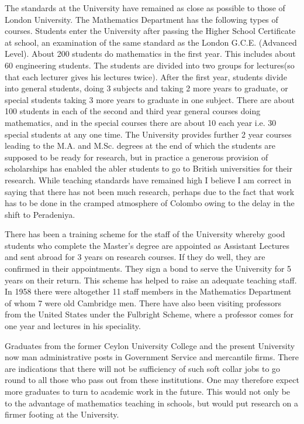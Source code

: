 The standards at the University have remained as close as possible to those of London University. The Mathematics Department has the following types of courses. Students enter the University after passing the Higher School Certificate at school, an examination of the same standard as the London G.C.E. (Advanced Level). About 200 students do mathematics in the first year. This includes about 60 engineering students. The students are divided into two groups for lectures\pageoriginale (so that each lecturer gives his lectures twice). After the first year, students divide into general students, doing 3 subjects and taking 2 more years to graduate, or special students taking 3 more years to graduate in one subject. There are about 100 students in each of the second and third year general courses doing mathematics, and in the special courses there are about 10 each year i.e. 30 special students at any one time. The University provides further 2 year courses leading to the M.A. and M.Sc. degrees at the end of which the students are supposed to be ready for research, but in practice a generous provision of scholarships has enabled the abler students to go to British universities for their research. While teaching standards have remained high I believe I am correct in saying that there has not been much research, perhaps due to the fact that work has to be done in the cramped atmosphere of Colombo owing to the delay in the shift to Peradeniya.

There has been a training scheme for the staff of the University whereby good students who complete the Master's degree are appointed as Assistant Lectures and sent abroad for 3 years on research courses. If they do well, they are confirmed in their appointments. They sign a bond to serve the University for 5 years on their return. This scheme has helped to raise an adequate teaching staff. In 1958 there were altogether 11 staff members in the Mathematics Department of whom 7 were old Cambridge men. There have also been visiting professors from the United States under the Fulbright Scheme, where a professor comes for one year and lectures in his speciality.

Graduates from the former Ceylon University College and the present University now man administrative posts in Government Service and mercantile firms. There are indications that there will not be sufficiency of such soft collar jobs to go round to all those who pass out from these institutions. One may therefore expect more graduates to turn to academic work in the future. This would not only be to the advantage of mathematics teaching in schools, but would put research on a firmer footing at the University.

